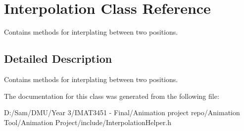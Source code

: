 \hypertarget{class_interpolation}{}\section{Interpolation Class Reference}
\label{class_interpolation}


Contains methods for interplating between two positions.  




\subsection{Detailed Description}
Contains methods for interplating between two positions. 

The documentation for this class was generated from the following file\+:\begin{DoxyCompactItemize}
\item 
D\+:/\+Sam/\+D\+M\+U/\+Year 3/\+I\+M\+A\+T3451 -\/ Final/\+Animation project repo/\+Animation Tool/\+Animation Project/include/Interpolation\+Helper.\+h\end{DoxyCompactItemize}
